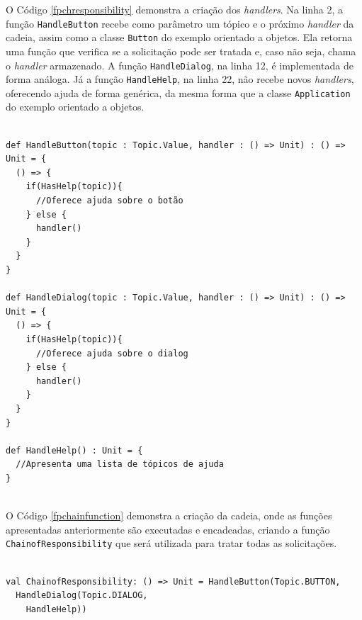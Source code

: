 O Código \ref{fpchresponsibility} demonstra a 
criação dos \textit{handlers}. Na linha 2, a 
função \texttt{HandleButton} recebe como parâmetro um 
tópico e o próximo \textit{handler} da cadeia, 
assim como a classe \texttt{Button} do exemplo orientado 
a objetos. Ela retorna uma função que verifica 
se a solicitação pode ser tratada e, caso 
não seja, chama o \textit{handler} armazenado. 
A função \texttt{HandleDialog}, na linha 12, é 
implementada de forma análoga. Já a função 
\texttt{HandleHelp}, na linha 22, não recebe novos 
\textit{handlers}, oferecendo ajuda de forma 
genérica, da mesma forma que a classe 
\texttt{Application} do exemplo orientado a objetos.

\begin{lstlisting}[caption={\textit{Chain of Responsibility} Funcional.},label=fpchresponsibility]
    
def HandleButton(topic : Topic.Value, handler : () => Unit) : () => Unit = {
  () => {
    if(HasHelp(topic)){
      //Oferece ajuda sobre o botão
    } else {
      handler()
    }
  }
}

def HandleDialog(topic : Topic.Value, handler : () => Unit) : () => Unit = {
  () => {
    if(HasHelp(topic)){
      //Oferece ajuda sobre o dialog
    } else {
      handler()
    }
  }
}

def HandleHelp() : Unit = {
  //Apresenta uma lista de tópicos de ajuda
}
    
\end{lstlisting}

O Código \ref{fpchainfunction} demonstra a criação 
da cadeia, onde as funções apresentadas anteriormente 
são executadas e encadeadas, criando a função 
\texttt{ChainofResponsibility} que será utilizada para 
tratar todas as solicitações.

\begin{lstlisting}[caption={Função \textit{Chain of Responsability}.},label=fpchainfunction]
    
val ChainofResponsibility: () => Unit = HandleButton(Topic.BUTTON,
  HandleDialog(Topic.DIALOG,
    HandleHelp))
      
\end{lstlisting}
